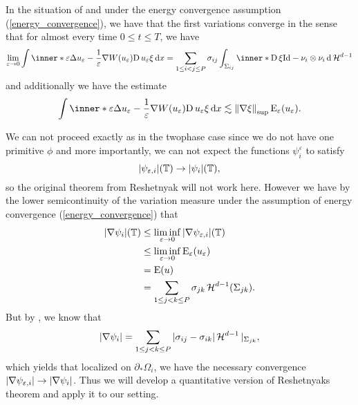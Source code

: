 \begin{proposition}
	\label{convergence_of_curvature_multiphase}
	In the situation of  and under 
	the energy convergence assumption (\ref{energy_convergence}), we have that 
	the first variations converge in the sense that for almost every time $ 0 
	\leq t \leq T $, we have
	\begin{equation*}
		\lim_{ \varepsilon \to 0 }
		\int
		\inner*{ 
			\varepsilon \Delta u_{ \varepsilon } - \frac{ 1 }{ 
				\varepsilon } \nabla W ( u_{ \varepsilon } ) 
		}
		{ \diff u_{ \varepsilon } \xi } 
		\dd{ x }
		=
		\sum_{ 1 \leq i < j \leq P }
		\sigma_{ i j }
		\int_{ \Sigma_{ i j } }
		\inner*{ \diff \xi }{ \mathrm{Id} - \nu_{ i } \otimes \nu_{ i } }
		\dd{ \hm^{ d - 1} }
	\end{equation*}
	and additionally we have the estimate
	\begin{equation}
		\label{pointwise_estimate_for_curvature}
		\int
		\inner*{ 
			\varepsilon \Delta u_{ \varepsilon } - \frac{ 1 }{ \varepsilon } 	
			\nabla W ( u_{ \varepsilon } ) }
		{ \diff u_{ \varepsilon } \xi }
		\dd{ x }
		\lesssim
		\norm{ \nabla \xi }_{ \sup }
		\energy_{ \varepsilon } ( u_{ \varepsilon } ).
	\end{equation}
\end{proposition}

\begin{remark}
	We can not proceed exactly as in the twophase case since we do not have one 
	primitive $ \phi $ and more importantly, we can not expect the functions $ 
	\psi_{ i }^{ \varepsilon } $ to satisfy 
	\begin{equation}
		\label{energy_convergence_of_psi_i}
		\abs{ \psi_{ \varepsilon ,i } } ( \operatorname{\mathbb{T}} ) \to \abs{ \psi_{ i } } ( 
		\operatorname{\mathbb{T}} ),
	\end{equation}
	so the original theorem from Reshetnyak will not work here. However we have 
	by the lower semicontinuity of the variation measure under the assumption 
	of energy convergence (\ref{energy_convergence}) that
	\begin{align*}
		\abs{ \nabla \psi_{ i } } ( \operatorname{\mathbb{T}} )
		&
		\leq
		\liminf_{ \varepsilon \to 0 }
		\abs{ \nabla \psi_{ \varepsilon , i } } ( \operatorname{\mathbb{T}} )
		\\
		& \leq
		\liminf_{ \varepsilon \to 0 }
		\operatorname{E}_{ \varepsilon } ( u_{ \varepsilon } )
		\\
		& =
		\operatorname{E} ( u )
		\\
		& =
		\sum_{ 1 \leq j < k \leq P }
		\sigma_{ j k }
		\operatorname{\mathcal{H}}^{ d -1 } ( \Sigma_{ j k } ).
	\end{align*}
	But by , we know that
	\begin{equation*}
		\abs{ \nabla \psi_{ i } }
		=
		\sum_{ 1 \leq j < k \leq P }
		\abs{ \sigma_{ i j } - \sigma_{ i k } }
		\operatorname{\mathcal{H}}^{ d - 1 } |_{ \Sigma_{ j k } },
	\end{equation*}
	which yields that localized on $ \partial_{ \ast } \Omega_{ i } $, we have 
	the necessary convergence $ \abs{ \nabla \psi_{ \varepsilon ,i } } \to 
	\abs{ \nabla \psi_{ i } } $. Thus we will develop a quantitative version of 
	Reshetnyaks theorem and apply it to our setting.
\end{remark}

